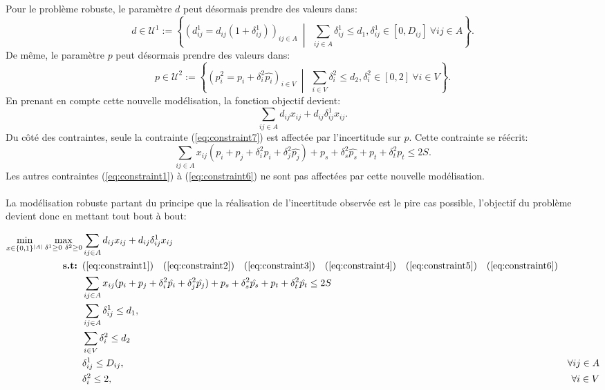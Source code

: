 \documentclass{article}
\begin{document}
Pour le problème robuste, le paramètre $d$ peut désormais prendre des valeurs dans:
\[
d \in \mathcal{U}^{1} := \left\{(d^{1}_{ij} = d_{ij}(1 + \delta^{1}_{ij}))_{ij \in A} \ \middle|\ \ \sum_{ij \in A} \delta^{1}_{ij} \leq d_1, \delta^{1}_{ij} \in [0, D_{ij}] \ \forall ij \in A\right\}.
\]
De même, le paramètre $p$ peut désormais prendre des valeurs dans:
\[
p \in \mathcal{U}^{2} := \left\{(p^{2}_{i} = p_{i} + \delta^{2}_{i} \hat{p_i})_{i \in V} \ \middle|\ \ \sum_{i \in V} \delta^{2}_{i} \leq d_2, \delta^{2}_{i} \in [0, 2] \ \forall i \in V\right\}.
\]
En prenant en compte cette nouvelle modélisation, la fonction objectif devient:
$$\sum_{ij \in A} d_{ij} x_{ij} + d_{ij} \delta_{ij}^{1} x_{ij}.$$
Du côté des contraintes, seule la contrainte (\ref{eq:constraint7}) est affectée par l'incertitude sur $p$. Cette contrainte se réécrit:
$$\sum_{ij \in A} x_{ij}(p_i + p_j + \delta_{i}^{2} \hat{p_i} + \delta_{j}^{2} \hat{p_j}) + p_s + \delta_{s}^{2} \hat{p_s} + p_t + \delta_{t}^{2} \hat{p_t} \leq 2S.$$
Les autres contraintes (\ref{eq:constraint1}) à (\ref{eq:constraint6}) ne sont pas affectées par cette nouvelle modélisation.
\\
\\
La modélisation robuste partant du principe que la réalisation de l'incertitude observée est le pire cas possible, l'objectif du problème devient donc en mettant tout bout à bout:

\begin{align}
  \min_{x \in \{0,1\}^{|A|}} \max_{\delta^{1} \geq 0 \hspace{3px}\delta^{2} \geq 0} & \sum_{ij \in A} d_{ij} x_{ij} + d_{ij} \delta_{ij}^{1} x_{ij} && \notag \\
  \textbf{s.t: }  & (\ref{eq:constraint1}) \quad (\ref{eq:constraint2}) \quad (\ref{eq:constraint3}) \quad (\ref{eq:constraint4}) \quad (\ref{eq:constraint5}) \quad (\ref{eq:constraint6}) \notag \\
  &\sum_{ij \in A} x_{ij}(p_i + p_j + \delta_{i}^{2} \hat{p_i} + \delta_{j}^{2} \hat{p_j}) + p_s + \delta_{s}^{2} \hat{p_s} + p_t + \delta_{t}^{2} \hat{p_t} \leq 2S \notag\\
  &\sum_{ij \in A} \delta_{ij}^{1} \leq d_1, \label{eq:constraint8} \\
  &\sum_{i \in V} \delta^{2}_{i} \leq d_2 \label{eq:constraint9} \\
  &\delta_{ij}^{1} \leq D_{ij}, & \forall ij \in A \label{eq:constraint10} \\
  &\delta^{2}_{i} \leq 2, & \forall i \in V \label{eq:constraint11}
\end{align}
\end{document}
